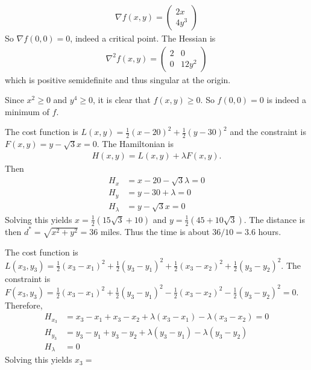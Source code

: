 \documentclass[12pt]{article}
\begin{document}
\begin{problem}[1.1.3]
\begin{align*}
	\nabla f(x,y) = \begin{pmatrix} 2x\\4y^3 \end{pmatrix} 
\end{align*}
So $ \nabla f(0,0) = 0$, indeed a critical point. The Hessian is
\begin{align*}
	\nabla ^2 f(x,y) = \begin{pmatrix} 2&0\\0&12y^2 \end{pmatrix} 
\end{align*}
which is positive semidefinite and thus singular at the origin. 

Since $ x^2 \geq 0$ and $ y^{4} \geq 0$, it is clear that $ f(x,y) \geq 0$. So  $ f(0,0)=0$ is indeed a minimum of  $ f$.
\end{problem}

\begin{problem}[1.2.1]
The cost function is $ L(x,y) = \frac{1}{2} (x-20)^2 + \frac{1}{2}(y-30)^2$ and the constraint is $ F(x,y)= y-\sqrt{3}x = 0$. The Hamiltonian is
\begin{align*}
	H(x,y) = L(x,y)+ \lambda F(x,y).
\end{align*}
Then
\begin{align*}
	H_x &= x-20 - \sqrt{3} \lambda =0\\
	H_y &= y-30 + \lambda = 0 \\
	H_\lambda &= y- \sqrt{3} x=0 
\end{align*}
Solving this yields $ x = \frac{1}{2}(15\sqrt{3}+10) $ and $ y = \frac{1}{2}(45+10\sqrt{3}) $. The distance is then $ d^* = \sqrt{x^2+y^2} =36 $ miles. Thus the time is about $ 36 / 10 = 3.6$ hours.
\end{problem}

\begin{problem}[1.2.2]
The cost function is $ L(x_3,y_3) = \frac{1}{2}(x_3-x_1)^2 + \frac{1}{2} (y_3-y_1)^2 + \frac{1}{2}(x_3-x_2)^2 + \frac{1}{2} (y_3-y_2)^2$. The constraint is $ F(x_3,y_3) = \frac{1}{2}(x_3-x_1)^2 + \frac{1}{2} (y_3-y_1)^2 - \frac{1}{2}(x_3-x_2)^2 - \frac{1}{2} (y_3-y_2)^2 =0$. Therefore,
\begin{align*}
	H_{x_3} &= x_3-x_1 + x_3-x_2 + \lambda(x_3-x_1) - \lambda (x_3-x_2)=0\\
	H_{y_3} &= y_3-y_1 + y_3-y_2 + \lambda(y_3-y_1) - \lambda (y_3-y_2) \\
	H_\lambda &= 0 
\end{align*}
Solving this yields $ x_3 = $
\end{problem}
\end{document}
